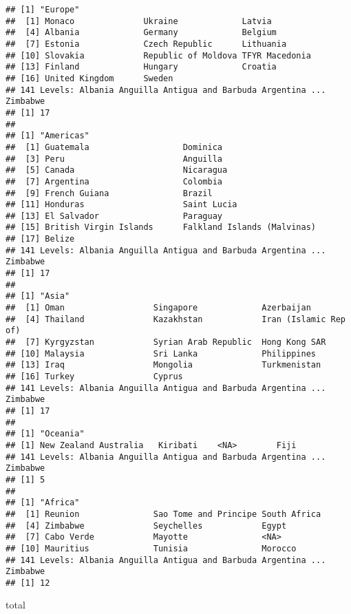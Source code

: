 \documentclass[]{article}
\newenvironment{Shaded}{\begin{snugshade}}{\end{snugshade}}
\newcommand{\NormalTok}[1]{#1}
\begin{document}
\begin{verbatim}
## [1] "Europe"
##  [1] Monaco              Ukraine             Latvia             
##  [4] Albania             Germany             Belgium            
##  [7] Estonia             Czech Republic      Lithuania          
## [10] Slovakia            Republic of Moldova TFYR Macedonia     
## [13] Finland             Hungary             Croatia            
## [16] United Kingdom      Sweden             
## 141 Levels: Albania Anguilla Antigua and Barbuda Argentina ... Zimbabwe
## [1] 17
## 
## [1] "Americas"
##  [1] Guatemala                   Dominica                   
##  [3] Peru                        Anguilla                   
##  [5] Canada                      Nicaragua                  
##  [7] Argentina                   Colombia                   
##  [9] French Guiana               Brazil                     
## [11] Honduras                    Saint Lucia                
## [13] El Salvador                 Paraguay                   
## [15] British Virgin Islands      Falkland Islands (Malvinas)
## [17] Belize                     
## 141 Levels: Albania Anguilla Antigua and Barbuda Argentina ... Zimbabwe
## [1] 17
## 
## [1] "Asia"
##  [1] Oman                  Singapore             Azerbaijan           
##  [4] Thailand              Kazakhstan            Iran (Islamic Rep of)
##  [7] Kyrgyzstan            Syrian Arab Republic  Hong Kong SAR        
## [10] Malaysia              Sri Lanka             Philippines          
## [13] Iraq                  Mongolia              Turkmenistan         
## [16] Turkey                Cyprus               
## 141 Levels: Albania Anguilla Antigua and Barbuda Argentina ... Zimbabwe
## [1] 17
## 
## [1] "Oceania"
## [1] New Zealand Australia   Kiribati    <NA>        Fiji       
## 141 Levels: Albania Anguilla Antigua and Barbuda Argentina ... Zimbabwe
## [1] 5
## 
## [1] "Africa"
##  [1] Reunion               Sao Tome and Principe South Africa         
##  [4] Zimbabwe              Seychelles            Egypt                
##  [7] Cabo Verde            Mayotte               <NA>                 
## [10] Mauritius             Tunisia               Morocco              
## 141 Levels: Albania Anguilla Antigua and Barbuda Argentina ... Zimbabwe
## [1] 12
\end{verbatim}

\begin{Shaded}
\begin{Highlighting}[]
\NormalTok{total}
\end{Highlighting}
\end{Shaded}
\end{document}
